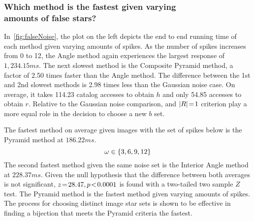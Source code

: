 \subsubsection{Which method is the fastest given varying \\ amounts of false stars?}
In~\autoref{fig:falseNoise}, the plot on the left depicts the end to end running time of each method given varying
amounts of spikes.
As the number of spikes increases from 0 to 12, the Angle method again experiences the largest response of
$1{,}234.15\si{ms}$.
The next slowest method is the Composite Pyramid method, a factor of 2.50 times faster than the Angle method.
The difference between the 1st and 2nd slowest methods is 2.98 times less than the Gaussian noise case.
On average, it takes 114.23 catalog accesses to obtain $h$ and only 54.85 accesses to obtain $r$.
Relative to the Gaussian noise comparison,  and $\left| R \right| \!=\! 1$ criterion play a more equal role in
the decision to choose a new $b$ set.

%
%
%
%
The fastest method on average given images with the set of spikes below is the Pyramid method at $186.22\si{ms}$.
\begin{equation}\label{eq:numberOfSpikes}
    \omega \in \set{ 3, 6, 9, 12 }
\end{equation}
The second fastest method given the same noise set is the Interior Angle method at $228.37\si{ms}$.
Given the null hypothesis that the difference between both averages is not significant, $z \!=\! 28.47, p\!<\!0.0001$ is
found with a two-tailed two sample $Z$ test.
The Pyramid method is the fastest method given varying amounts of spikes.
The process for choosing distinct image star sets is shown to be effective in finding a bijection that meets the Pyramid
criteria the fastest.

